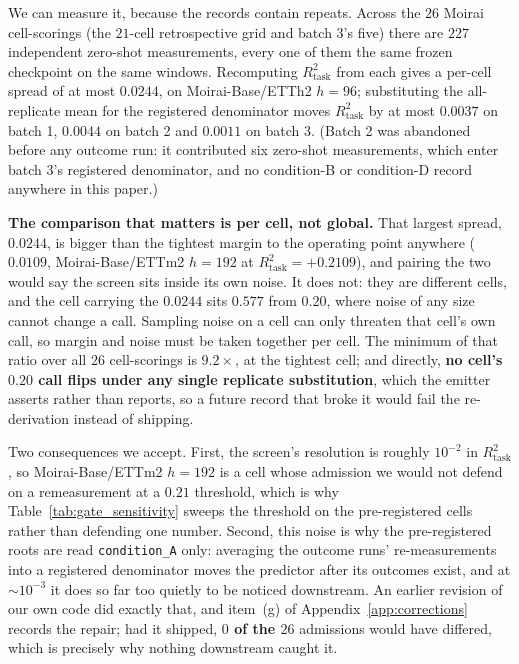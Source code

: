 We can measure it, because the records contain repeats.  Across the $26$ Moirai
cell-scorings (the $21$-cell retrospective grid and batch 3's five) there are
$227$ independent zero-shot measurements, every one of them the same frozen
checkpoint on the same windows.  Recomputing $R^2_\text{task}$ from each gives a
per-cell spread of at most $0.0244$, on Moirai-Base/ETTh2 $h{=}96$; substituting
the all-replicate mean for the registered denominator moves $R^2_\text{task}$ by at
most $0.0037$ on batch 1, $0.0044$ on batch 2 and $0.0011$ on batch 3.
(Batch 2 was abandoned before any outcome run: it contributed six zero-shot
measurements, which enter batch 3's registered denominator, and no condition-B or
condition-D record anywhere in this paper.)

\textbf{The comparison that matters is per cell, not global.}  That largest spread,
$0.0244$, is bigger than the tightest margin to the operating point anywhere
($0.0109$, Moirai-Base/ETTm2 $h{=}192$ at $R^2_\text{task}{=}{+}0.2109$), and
pairing the two would say the screen sits inside its own noise.  It does not: they
are different cells, and the cell carrying the $0.0244$ sits $0.577$ from $0.20$,
where noise of any size cannot change a call.  Sampling noise on a cell can only
threaten that cell's own call, so margin and noise must be taken together per cell.
The minimum of that ratio over all $26$ cell-scorings is $9.2\times$, at the
tightest cell; and directly, \textbf{no cell's $0.20$ call flips under any single
replicate substitution}, which the emitter asserts rather than reports, so a
future record that broke it would fail the re-derivation instead of shipping.

Two consequences we accept.  First, the screen's resolution is roughly $10^{-2}$ in
$R^2_\text{task}$, so Moirai-Base/ETTm2 $h{=}192$ is a cell whose admission we would
not defend on a remeasurement at a $0.21$ threshold, which is why
Table~\ref{tab:gate_sensitivity} sweeps the threshold on the pre-registered cells
rather than defending one number.  Second, this noise is why the pre-registered
roots are read \texttt{condition\_A} only: averaging the outcome runs'
re-measurements into a registered denominator moves the predictor after its
outcomes exist, and at ${\sim}10^{-3}$ it does so far too quietly to be noticed
downstream.  An earlier revision of our own code did exactly that, and
item~(g) of Appendix~\ref{app:corrections} records the repair; had it shipped,
\textbf{$0$ of the $26$} admissions would have differed, which is precisely why
nothing downstream caught it.

